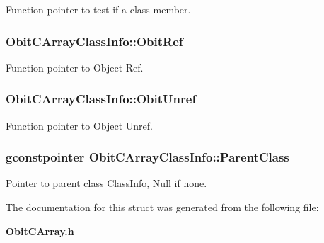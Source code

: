 Function pointer to test if a class member. 

\subsubsection{ {\bf Obit\-CArray\-Class\-Info::Obit\-Ref}}\label{structObitCArrayClassInfo_o10}


Function pointer to Object Ref. 

\subsubsection{ {\bf Obit\-CArray\-Class\-Info::Obit\-Unref}}\label{structObitCArrayClassInfo_o11}


Function pointer to Object Unref. 

\subsubsection{\setlength{\rightskip}{0pt plus 5cm}gconstpointer {\bf Obit\-CArray\-Class\-Info::Parent\-Class}}\label{structObitCArrayClassInfo_o3}


Pointer to parent class Class\-Info, Null if none. 



The documentation for this struct was generated from the following file:\begin{CompactItemize}
\item 
{\bf Obit\-CArray.h}\end{CompactItemize}
